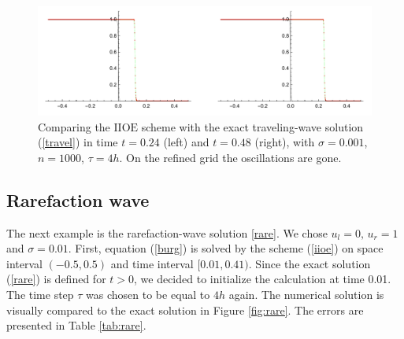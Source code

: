 \documentclass[../include.tex]{subfiles}
\begin{document}
\begin{figure}[h!]
	\centering
	\includegraphics[width=\textwidth]{figures/travelsig0011000024048}
	\caption{Comparing the $ \mathrm{IIOE} $ scheme with the exact traveling-wave solution {\rm (\ref{travel})} in time $ t=0.24 $ (left) and $ t = 0.48 $ (right), with $ \sigma=0.001 $, $ n=1000 $, $ \tau=4h $. On the refined grid the oscillations are gone.}
	\label{fig:travel_sig1/1000_n1000}
\end{figure}
\newpage
\subsection{Rarefaction wave}
The next example is the rarefaction-wave solution \eqref{rare}. We chose $ u_l = 0,\,u_r = 1 $ and $ \sigma = 0.01 $. First, equation (\ref{burg}) is solved by the scheme (\ref{iioe}) on space interval $ (-0.5, 0.5) $ and time interval $ [0.01, 0.41) $. Since the exact solution (\ref{rare}) is defined for $ t>0 $, we decided to initialize the calculation at time 0.01. The time step $ \tau $ was chosen to be equal to $ 4h $ again. The numerical solution is visually compared to the exact solution in Figure \ref{fig:rare}. The errors are presented in Table \ref{tab:rare}.
\end{document}
